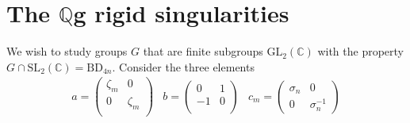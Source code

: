 \documentclass[11pt]{report}
\theoremstyle{definition}
\theoremstyle{definition}
\theoremstyle{definition}
\theoremstyle{definition}
\theoremstyle{definition}
\theoremstyle{definition}
\theoremstyle{definition}
\theoremstyle{definition}
\newcommand{\spl}{\text{SL}_2 (\mathbb{C})}
\newcommand{\gl}{\text{GL}_2 (\mathbb{C})}
\begin{document}
 

\section{The $\mathbb{Q}$g rigid singularities}

We wish to study groups $G$ that are finite subgroups $\gl$ with the property $G \cap \spl = \text{BD}_{4n}$. Consider the three elements
\[
\begin{array}{ccc}
a = \left(
\begin{array}{cc}
\zeta_{m} & 0  \\
0 & \zeta_{m} \\
\end{array} \right) &
b = \left(
\begin{array}{cc}
0 & 1  \\
-1 & 0 \\
\end{array} \right) &c_m =
\left( \begin{array}{cc}
\sigma_{n} & 0 \\
0 & \sigma^{-1}_n
\end{array} \right) 
\end{array}
\]
\end{document}
